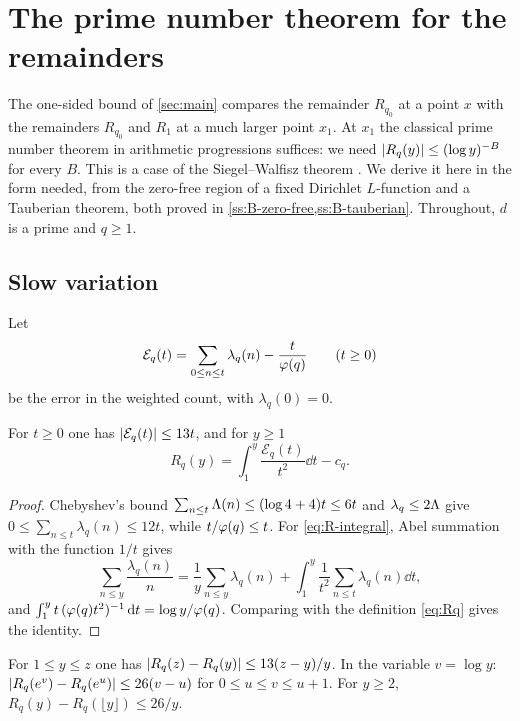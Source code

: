 \section{The prime number theorem for the remainders}\label{sec:pnt}

The one-sided bound of \cref{sec:main} compares the remainder $R_{q_0}$ at a point $x$ with the
remainders $R_{q_0}$ and $R_1$ at a much larger point $x_1$. At $x_1$ the classical prime number
theorem in arithmetic progressions suffices: we need $\lvert R_q(y)\rvert\le(\log y)^{-B}$ for every $B$.
This is a case of the Siegel--Walfisz theorem
\cite[Cor.~11.19]{MontgomeryVaughan2007}. We derive it here in the form needed, from the zero-free
region of a fixed Dirichlet $L$-function and a Tauberian theorem, both proved in
\cref{ss:B-zero-free,ss:B-tauberian}. Throughout, $d$ is a prime and $q\ge1$.

\subsection{Slow variation}\label{ss:slow-variation}
Let
\[
  \mathcal E_q(t)=\sum_{0\le n\le t}\lambda_q(n)-\frac{t}{\varphi(q)}\qquad(t\ge0)
\]
be the error in the weighted count, with $\lambda_q(0)=0$.

\begin{lemma}\label{lem:count-error}
For $t\ge0$ one has $\lvert \mathcal E_q(t)\rvert\le13t$, and for $y\ge1$
\begin{equation}\label{eq:R-integral}
  R_q(y)=\int_1^y\frac{\mathcal E_q(t)}{t^2}\dd t-c_q.
\end{equation}
\end{lemma}

\begin{proof}
Chebyshev's bound $\sum_{n\le t}\Lambda(n)\le(\log4+4)t\le6t$ and $\lambda_q\le2\Lambda$ give
$0\le\sum_{n\le t}\lambda_q(n)\le12t$, while $t/\varphi(q)\le t$. For \eqref{eq:R-integral}, Abel
summation with the function $1/t$ gives
\[
  \sum_{n\le y}\frac{\lambda_q(n)}{n}=\frac1y\sum_{n\le y}\lambda_q(n)
  +\int_1^y\frac{1}{t^2}\sum_{n\le t}\lambda_q(n)\dd t,
\]
and $\int_1^y t\,(\varphi(q)t^2)^{-1}\mathop{}\!\mathrm{d} t=\log y/\varphi(q)$. Comparing with the definition
\eqref{eq:Rq} gives the identity.
\end{proof}

\begin{corollary}\label{cor:slow-variation}
For $1\le y\le z$ one has $\lvert R_q(z)-R_q(y)\rvert\le13(z-y)/y$. In the variable $v=\log y$:
$\lvert R_q(e^v)-R_q(e^u)\rvert\le26(v-u)$ for $0\le u\le v\le u+1$. For $y\ge2$,
$R_q(y)-R_q(\lfloor y\rfloor)\le 26/y$.
\end{corollary}

